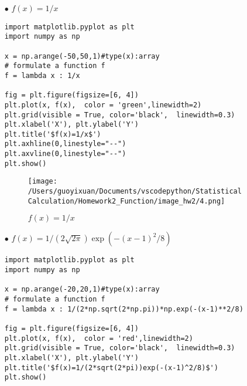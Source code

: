 \begin{itemize}
\begin{lstlisting}
x = np.arange(-10,100,1)#type(x):array
# formulate a function f
f = lambda x : ((4-x**3)/(1+x**2))**(1/3)
 
fig = plt.figure(figsize=[6, 4])
plt.plot(x, f(x),  color = 'skyblue',linewidth=3)
plt.grid(visible = True, color='black',  linewidth=0.3)
plt.xlabel('X'), plt.ylabel('Y')
plt.title('$f(x)=f(x)=\sqrt[3]{(4-x^3)/(1+x^2)}$')
plt.show()
\end{lstlisting}

\begin{figure}[H]
    \centering
        \texttt{[image: /Users/guoyixuan/Documents/vscodepython/Statistical Calculation/Homework2\_Function/image\_hw2/3.png]}
    \caption{$f(x)=\sqrt[3]{(4-x^3)/(1+x^2)}$}
    \label{fig:exp/exp}
\end{figure}

\item[$\bullet$] $f(x)=1/x$
\bigskip
\begin{lstlisting}
import matplotlib.pyplot as plt
import numpy as np
 
x = np.arange(-50,50,1)#type(x):array
# formulate a function f
f = lambda x : 1/x
 
fig = plt.figure(figsize=[6, 4])
plt.plot(x, f(x),  color = 'green',linewidth=2)
plt.grid(visible = True, color='black',  linewidth=0.3)
plt.xlabel('X'), plt.ylabel('Y')
plt.title('$f(x)=1/x$')
plt.axhline(0,linestyle="--")
plt.axvline(0,linestyle="--")
plt.show()
\end{lstlisting}

\begin{figure}[H]
    \centering
        \texttt{[image: /Users/guoyixuan/Documents/vscodepython/Statistical Calculation/Homework2\_Function/image\_hw2/4.png]}
    \caption{$f(x)=1/x$}
    \label{fig:1/x}
\end{figure}

\item[$\bullet$] $f(x)=1/(2\sqrt{2 \pi}) \exp(-(x-1)^2/8)$
\bigskip
\begin{lstlisting}
import matplotlib.pyplot as plt
import numpy as np
 
x = np.arange(-20,20,1)#type(x):array
# formulate a function f
f = lambda x : 1/(2*np.sqrt(2*np.pi))*np.exp(-(x-1)**2/8)
 
fig = plt.figure(figsize=[6, 4])
plt.plot(x, f(x),  color = 'red',linewidth=2)
plt.grid(visible = True, color='black',  linewidth=0.3)
plt.xlabel('X'), plt.ylabel('Y')
plt.title('$f(x)=1/(2*sqrt(2*pi))exp(-(x-1)^2/8)$')
plt.show()
\end{lstlisting}


\end{itemize}
